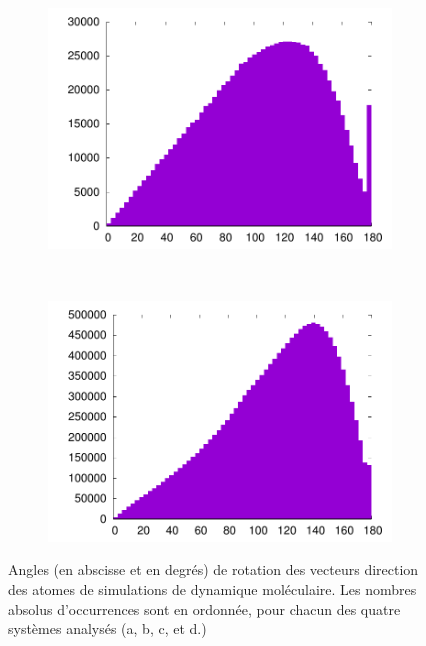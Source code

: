 \begin{figure}[htb]
\begin{subfigure}[t]{\subImgWaStats}
			\includegraphics[width=\textwidth]{figures/ch3/snare_tmd_gg_all_angles}
			\caption{}
			\label{fig:snare_tmd_gg_all_angles}
		\end{subfigure}
		~
		\begin{subfigure}[t]{\subImgWaStats}
			\centering
			\includegraphics[width=\textwidth]{figures/ch3/gk_extension_all_angles}
			\caption{}
			\label{fig:gk_extension_all_angles}
		\end{subfigure}
		\caption[Angles de rotation, dynamique moléculaire]{Angles (en abscisse et en degrés) de rotation des vecteurs direction des atomes de simulations de dynamique moléculaire. Les nombres absolus d'occurrences sont en ordonnée, pour chacun des quatre systèmes analysés (a, b, c, et d.)}
		\label{fig:dynMolAngles}
	\end{figure}
	

